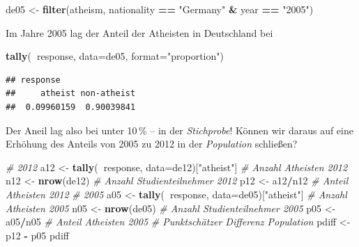 \documentclass[12pt,ngerman,paper=a4,pagesize,DIV=13]{scrreprt}
\newenvironment{Shaded}{\begin{snugshade}}{\end{snugshade}}
\newcommand{\CommentTok}[1]{\textcolor[rgb]{0.56,0.35,0.01}{\textit{#1}}}
\newcommand{\DataTypeTok}[1]{\textcolor[rgb]{0.13,0.29,0.53}{#1}}
\newcommand{\KeywordTok}[1]{\textcolor[rgb]{0.13,0.29,0.53}{\textbf{#1}}}
\newcommand{\NormalTok}[1]{#1}
\newcommand{\OperatorTok}[1]{\textcolor[rgb]{0.81,0.36,0.00}{\textbf{#1}}}
\newcommand{\StringTok}[1]{\textcolor[rgb]{0.31,0.60,0.02}{#1}}
\begin{document}
\begin{Shaded}
\begin{Highlighting}[]
\NormalTok{de05 <-}\StringTok{ }\KeywordTok{filter}\NormalTok{(atheism, nationality }\OperatorTok{==}\StringTok{ "Germany"} \OperatorTok{&}\StringTok{ }\NormalTok{year }\OperatorTok{==}\StringTok{ "2005"}\NormalTok{)}
\end{Highlighting}
\end{Shaded}

Im Jahre 2005 lag der Anteil der Atheisten in Deutschland bei

\begin{Shaded}
\begin{Highlighting}[]
\KeywordTok{tally}\NormalTok{(}\OperatorTok{~}\NormalTok{response, }\DataTypeTok{data=}\NormalTok{de05, }\DataTypeTok{format=}\StringTok{"proportion"}\NormalTok{)}
\end{Highlighting}
\end{Shaded}

\begin{verbatim}
## response
##     atheist non-atheist 
##  0.09960159  0.90039841
\end{verbatim}

Der Aneil lag also bei unter 10\(\,\)\% -- in der \emph{Stichprobe}!
Können wir daraus auf eine Erhöhung des Anteils von 2005 zu 2012 in der
\emph{Population} schließen?

\begin{Shaded}
\begin{Highlighting}[]
\CommentTok{# 2012}
\NormalTok{a12 <-}\StringTok{ }\KeywordTok{tally}\NormalTok{(}\OperatorTok{~}\NormalTok{response, }\DataTypeTok{data=}\NormalTok{de12)[}\StringTok{"atheist"}\NormalTok{] }\CommentTok{# Anzahl Atheisten 2012}
\NormalTok{n12 <-}\StringTok{ }\KeywordTok{nrow}\NormalTok{(de12) }\CommentTok{# Anzahl Studienteilnehmer 2012}
\NormalTok{p12 <-}\StringTok{ }\NormalTok{a12}\OperatorTok{/}\NormalTok{n12 }\CommentTok{# Anteil Atheisten 2012}
\CommentTok{# 2005 }
\NormalTok{a05 <-}\StringTok{ }\KeywordTok{tally}\NormalTok{(}\OperatorTok{~}\NormalTok{response, }\DataTypeTok{data=}\NormalTok{de05)[}\StringTok{"atheist"}\NormalTok{] }\CommentTok{# Anzahl Atheisten 2005}
\NormalTok{n05 <-}\StringTok{ }\KeywordTok{nrow}\NormalTok{(de05) }\CommentTok{# Anzahl Studienteilnehmer 2005}
\NormalTok{p05 <-}\StringTok{ }\NormalTok{a05}\OperatorTok{/}\NormalTok{n05 }\CommentTok{# Anteil Atheisten 2005}
\CommentTok{# Punktschätzer Differenz Population}
\NormalTok{pdiff <-}\StringTok{ }\NormalTok{p12 }\OperatorTok{-}\StringTok{ }\NormalTok{p05}
\NormalTok{pdiff}
\end{Highlighting}
\end{Shaded}
\end{document}
